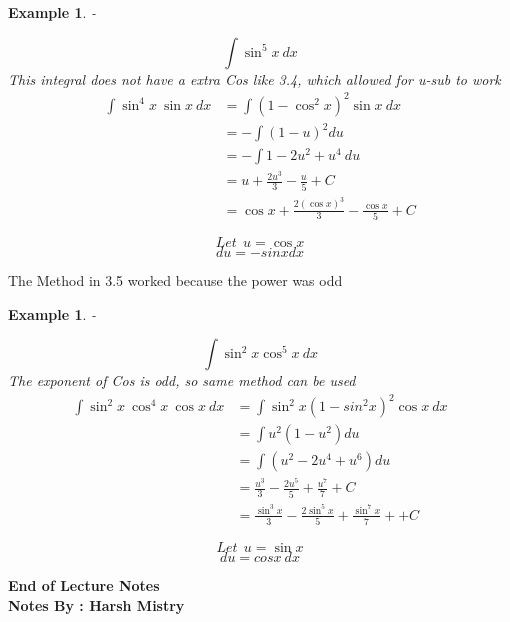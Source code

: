 \documentclass{article}
\newtheorem{ex}[theorem]{Example}
\begin{document}
\newpage 

\begin{ex} 
-\\
\begin{minipage}{.5\textwidth} %
$$\int \sin ^5 x \ dx $$
This integral does not have a extra Cos like 3.4, which allowed for u-sub to work 
$$
\begin{aligned}
\int \sin ^4 x  \ \sin x  \ dx & = \int ( 1 - \cos ^2 x) ^2 \sin x \ dx \\
& = - \int (1 - u) ^ 2 du \\
& = - \int 1 - 2u^2 + u^4  \ du \\
& = u + \frac{2u^3}{3} - \frac{u}{5} + C \\
& = \cos x + \frac{2(\cos x)^3}{3} - \frac{\cos x}{5} + C
\end{aligned}
$$
\end{minipage} %
\begin{minipage}{.5\textwidth} %
$$ Let \ \ u = \cos x $$
$$ du = -sinx dx $$
\end{minipage}
\end{ex}
The Method in 3.5 worked because the power was odd 

\begin{ex} 
-\\
\begin{minipage}{.5\textwidth} %
$$\int \sin ^2 x \cos ^5 x \ dx $$
The exponent of Cos is odd, so same method can be used
$$
\begin{aligned}
\int \sin ^2 x  \ \cos ^4 x \ \cos x  \ dx & = \int \sin ^2 x (1 - sin ^2 x) ^2 \cos x \ dx \\
& = \int u^2 (1-u^2) du \\
& = \int (u^2 - 2u^4 + u^6) du \\
& = \frac{u^3}{3} - \frac{2u^5}{5} + \frac{u^7}{7} + C \\
& = \frac{\sin ^3 x}{3} - \frac{2 \sin ^5 x}{5} + \frac{\sin ^7 x}{7} + + C
\end{aligned}
$$
\end{minipage} %
\begin{minipage}{.5\textwidth} %
$$ Let \ \ u = \sin x $$
$$ du = cos  x \ dx $$
\end{minipage}
\end{ex}

\begin{center}
\textbf{End of Lecture Notes} \\
\textbf{Notes By : Harsh Mistry}
\end{center}
\end{document}
